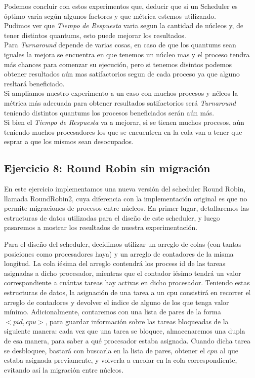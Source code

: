 \vspace{0,5 cm}
Podemos concluir con estos experimentos que, deducir que si un Scheduler es \'optimo varia seg\'un algunos factores y que m\'etrica estemos utilizando.\\
Pudimos ver que \textit{Tiempo de Respuesta} varia segun la cantidad de n\'ucleos y, de tener distintos quantums, esto puede mejorar los resultados.\\
Para \textit{Turnaround} depende de varias cosas, en caso de que los quantums sean iguales la mejora se encuentra en que tenemos un n\'ucleo mas y el proceso tendra m\'as chances para comenzar su ejecuci\'on, pero si tenemos disintos podemos obtener resultados a\'un mas satifactorios segun de cada proceso ya que alguno resltar\'a beneficiado.\\
Si ampliamos nuestro experimento a un caso con muchos procesos y n\'cleos la m\'etrica m\'as adecuada para obtener resultados satifactorios ser\'a \textit{Turnaround} teniendo distintos quantums los procesos beneficiados ser\'an a\'un m\'as. \\
Si bien el \textit{Tiempo de Respuesta} va a mejorar, si se tienen muchos procesos, a\'un teniendo muchos procesadores los que se encuentren en la cola van a tener que esprar a que los mismos sean desocupados.

\subsection{Ejercicio 8: Round Robin sin migraci\'on}

En este ejercicio implementamos una nueva versi\'on del scheduler Round Robin, llamada RoundRobin2, cuya diferencia con la implementaci\'on original
es que no permite migraciones de procesos entre n\'ucleos. En primer lugar, detallaremos las estructuras de datos utilizadas para el dise\~no de
este scheduler, y luego pasaremos a mostrar los resultados de nuestra experimentaci\'on.

Para el dise\~no del scheduler, decidimos utilizar un arreglo de colas (con tantas posiciones como procesadores haya) y un arreglo de contadores de la misma 
longitud. La cola i\'esima del arreglo contendr\'a los process id de las tareas asignadas a dicho procesador, mientras que el contador i\'esimo tendr\'a un 
valor correspondiente a cu\'antas tareas hay activas en dicho procesador. Teniendo estas estructuras de datos, la asignaci\'on de una tarea a un cpu consistir\'a
en recorrer el arreglo de contadores y devolver el \'indice de alguno de los que tenga valor m\'inimo. 
Adicionalmente, contaremos con una lista de pares de la forma $<pid,cpu>$, para guardar informaci\'on sobre las tareas bloqueadas de la siguiente manera: 
cada vez que una tarea se bloquee, almacenaremos una dupla de esa manera, para saber a qu\'e procesador estaba asignada. Cuando dicha tarea se desbloquee,
bastar\'a con buscarla en la lista de pares, obtener el $cpu$ al que estaba asignada previamente, y volverla a encolar en la cola correspondiente, evitando
as\'i la migraci\'on entre n\'ucleos.

